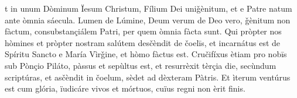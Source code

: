 t in unum Dòminum Ïesum Christum, Fílium Dei uniǧènitum, et e Patre natum ante òmnia sáecula. Lumen de Lúmine, Deum verum de Deo vero, ǧènitum non fàctum, consubstançiálem Patri, per quem òmnia fàcta sunt. Qui pròpter nos hòmines et pròpter nostram salútem desčèndit de čoelīs, et incarnátus est de Spíritu Sancto e María Vìrǧine, et hòmo fàctus est. Cručifíxus ètiam pro nobīs sub Pònçio Piláto, pàssus et sepùltus est, et resurrèxit tèrçia die, secùndum scriptúras, et asčèndit in čoelum, sèdet ad dèxteram Pàtris. Et ìterum ventúrus est cum glória, ïudicáre vivos et mórtuos, cuïus regni non èrit finis.
